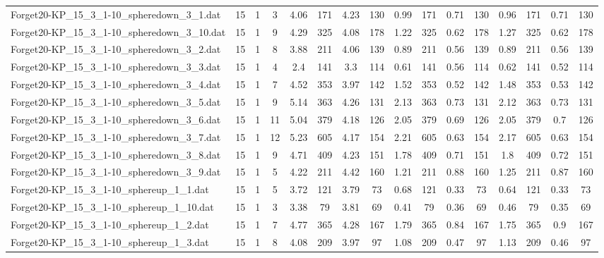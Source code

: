 \begin{sidewaystable}[!ht]
{\begin{tabular}{lccccccccccccccc}
Forget20-KP\_15\_3\_1-10\_spheredown\_3\_1.dat & 15 & 1 & 3 & 4.06 & 171 & 4.23 & 130 & 0.99 & 171 &  \textcolor{blue2}{0.71} & 130 & 0.96 & 171 &  \textcolor{blue2}{0.71} & 130 \\
Forget20-KP\_15\_3\_1-10\_spheredown\_3\_10.dat & 15 & 1 & 9 & 4.29 & 325 & 4.08 & 178 & 1.22 & 325 & 0.62 & 178 & 1.27 & 325 & 0.62 & 178 \\
Forget20-KP\_15\_3\_1-10\_spheredown\_3\_2.dat & 15 & 1 & 8 & 3.88 & 211 & 4.06 & 139 & 0.89 & 211 &  \textcolor{blue2}{0.56} & 139 & 0.89 & 211 &  \textcolor{blue2}{0.56} & 139 \\
Forget20-KP\_15\_3\_1-10\_spheredown\_3\_3.dat & 15 & 1 & 4 & 2.4 & 141 & 3.3 & 114 & 0.61 & 141 & 0.56 & 114 & 0.62 & 141 &  \textcolor{blue2}{0.52} & 114 \\
Forget20-KP\_15\_3\_1-10\_spheredown\_3\_4.dat & 15 & 1 & 7 & 4.52 & 353 & 3.97 & 142 & 1.52 & 353 &  \textcolor{blue2}{0.52} & 142 & 1.48 & 353 & 0.53 & 142 \\
Forget20-KP\_15\_3\_1-10\_spheredown\_3\_5.dat & 15 & 1 & 9 & 5.14 & 363 & 4.26 & 131 & 2.13 & 363 & 0.73 & 131 & 2.12 & 363 & 0.73 & 131 \\
Forget20-KP\_15\_3\_1-10\_spheredown\_3\_6.dat & 15 & 1 & 11 & 5.04 & 379 & 4.18 & 126 & 2.05 & 379 &  \textcolor{blue2}{0.69} & 126 & 2.05 & 379 & 0.7 & 126 \\
Forget20-KP\_15\_3\_1-10\_spheredown\_3\_7.dat & 15 & 1 & 12 & 5.23 & 605 & 4.17 & 154 & 2.21 & 605 & 0.63 & 154 & 2.17 & 605 & 0.63 & 154 \\
Forget20-KP\_15\_3\_1-10\_spheredown\_3\_8.dat & 15 & 1 & 9 & 4.71 & 409 & 4.23 & 151 & 1.78 & 409 & 0.71 & 151 & 1.8 & 409 & 0.72 & 151 \\
Forget20-KP\_15\_3\_1-10\_spheredown\_3\_9.dat & 15 & 1 & 5 & 4.22 & 211 & 4.42 & 160 & 1.21 & 211 & 0.88 & 160 & 1.25 & 211 &  \textcolor{blue2}{0.87} & 160 \\
Forget20-KP\_15\_3\_1-10\_sphereup\_1\_1.dat & 15 & 1 & 5 & 3.72 & 121 & 3.79 & 73 & 0.68 & 121 &  \textcolor{blue2}{0.33} & 73 & 0.64 & 121 &  \textcolor{blue2}{0.33} & 73 \\
Forget20-KP\_15\_3\_1-10\_sphereup\_1\_10.dat & 15 & 1 & 3 & 3.38 & 79 & 3.81 & 69 & 0.41 & 79 & 0.36 & 69 & 0.46 & 79 &  \textcolor{blue2}{0.35} & 69 \\
Forget20-KP\_15\_3\_1-10\_sphereup\_1\_2.dat & 15 & 1 & 7 & 4.77 & 365 & 4.28 & 167 & 1.79 & 365 &  \textcolor{blue2}{0.84} & 167 & 1.75 & 365 & 0.9 & 167 \\
Forget20-KP\_15\_3\_1-10\_sphereup\_1\_3.dat & 15 & 1 & 8 & 4.08 & 209 & 3.97 & 97 & 1.08 & 209 & 0.47 & 97 & 1.13 & 209 &  \textcolor{blue2}{0.46} & 97 \\

\end{tabular}}
\end{sidewaystable}
